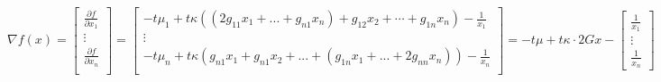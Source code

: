 \documentclass[fleqn]{article}
\begin{document}
$
\nabla f(x) = \begin{bmatrix} \frac{\partial f}{\partial x_1} \\
				\vdots \\     \frac{\partial f}{\partial x_n} \\ \end{bmatrix} 
=
\begin{bmatrix} 
	-t \mu_1 + t\kappa ((2 g_{11} x_1 +...+g_{n1}x_n)+
		 g_{12}x_2 + \cdots + g_{1n}x_n) - \frac{1}{x_1}\\
	\vdots 							\\
	-t \mu_n+ t\kappa(g_{n1}x_1 +g_{n1}x_2 + ...+ (g_{1n}x_1+...+2g_{nn}x_n))  - \frac{1}{x_n}\\
\end{bmatrix} 
=
-t \mu +t \kappa \cdot 2Gx -
\begin{bmatrix}
	\frac{1}{x_1} \\
	\vdots        \\
	\frac{1}{x_n}
\end{bmatrix} 
$ \\ \\
\end{document}

